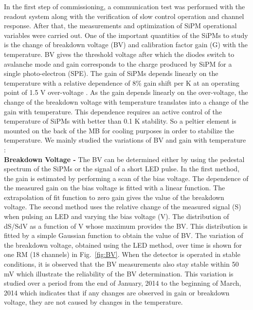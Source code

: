 In the first step of commissioning, a communication test was performed with the readout system along with the verification of slow control operation and channel response. After that, the measurements and optimization of SiPM operational variables were carried out. One of the important quantities of the SiPMs to study is the change of breakdown voltage (BV) and calibration factor gain (G) with the temperature. BV gives the threshold voltage after which the diodes switch to avalanche mode and gain corresponds to the charge produced by SiPM for a single photo-electron (SPE). The gain of SiPMs depends linearly on the temperature with a relative dependence of 8\% gain shift per K at an operating point of 1.5 V over-voltage \cite{Anderson:2011zzc}. As the gain depends linearly on the over-voltage, the change of the breakdown voltage with temperature translates into a change of the gain with temperature. This dependence requires an active control of the temperature of SiPMs with better than 0.1 K stability. So a peltier element is mounted on the back of the MB for cooling purposes in order to stabilize the temperature. We mainly studied the variations of BV and gain with temperature : \\ \newline
{\bf Breakdown Voltage -} The BV can be determined either by using the pedestal spectrum of the SiPMs or the signal of a short LED pulse. In the first method, the gain is estimated by performing a scan of the bias voltage. The dependence of the measured gain on the bias voltage is fitted with a linear function. The extrapolation of fit function to zero gain gives the value of the breakdown voltage. The second method uses the relative change of the measured signal (S) when pulsing an LED and varying the bias voltage (V). The distribution of dS/SdV as a function of V whose maximum provides the BV. This distribution is fitted by a simple Gaussian function to obtain the value of BV. The variation of the breakdown voltage, obtained using the LED method, over time is shown for one RM (18 channels) in Fig.~\ref{fig:BV}. When the detector is operated in stable conditions, it is observed that the BV measurements also stay stable within 50 mV which illustrate the reliability of the BV determination. This variation is studied over a period from the end of January, 2014 to the beginning of March, 2014 which indicates that if any changes are observed in gain or breakdown voltage, they are not caused by changes in the temperature.\\ \newline
